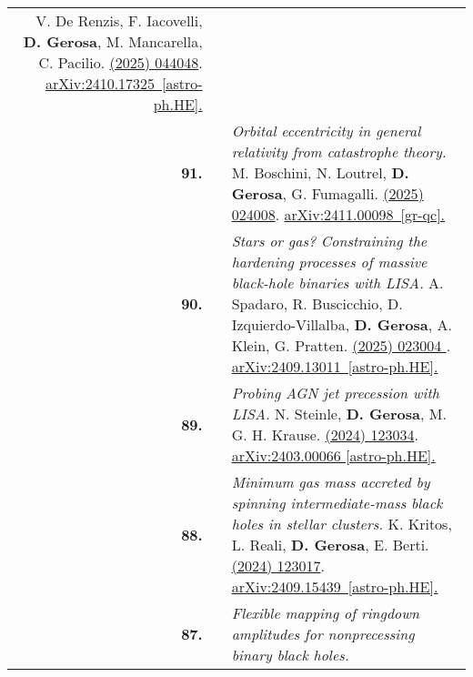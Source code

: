 {\begin{longtable}{rp{0.3cm}p{15.8cm}}
\newline{}
V. De Renzis, F. Iacovelli, \textbf{D. Gerosa}, M. Mancarella, C. Pacilio.
\newline{}
\href{https://journals.aps.org/prd/abstract/10.1103/PhysRevD.111.044048}{\prd 111 (2025) 044048}. \href{https://arxiv.org/abs/2410.17325}{arXiv:2410.17325 [astro-ph.HE].}
\vspace{0.09cm}\\
%
\textbf{91.} & & \textit{Orbital eccentricity in general relativity from catastrophe theory.}
\newline{}
M. Boschini, N. Loutrel, \textbf{D. Gerosa}, G. Fumagalli.
\newline{}
\href{https://journals.aps.org/prd/abstract/10.1103/PhysRevD.111.024008}{\prd 111 (2025) 024008}. \href{https://arxiv.org/abs/2411.00098}{arXiv:2411.00098 [gr-qc].}
\vspace{0.09cm}\\
%
\textbf{90.} & & \textit{Stars or gas? Constraining the hardening processes of massive black-hole binaries with LISA.}
\newline{}
A. Spadaro, R. Buscicchio, D. Izquierdo-Villalba, \textbf{D. Gerosa}, A. Klein, G. Pratten.
\newline{}
\href{https://journals.aps.org/prd/abstract/10.1103/PhysRevD.111.023004}{\prd 111 (2025) 023004 }. \href{https://arxiv.org/abs/2409.13011}{arXiv:2409.13011 [astro-ph.HE].}
\vspace{0.09cm}\\
%
\textbf{89.} & & \textit{Probing AGN jet precession with LISA.}
\newline{}
N. Steinle, \textbf{D. Gerosa}, M. G. H. Krause.
\newline{}
\href{https://journals.aps.org/prd/abstract/10.1103/PhysRevD.110.123034}{\prd 110 (2024) 123034}. \href{https://arxiv.org/abs/2403.00066}{arXiv:2403.00066 [astro-ph.HE].}
\vspace{0.09cm}\\
%
\textbf{88.} & & \textit{Minimum gas mass accreted by spinning intermediate-mass black holes in stellar clusters.}
\newline{}
K. Kritos, L. Reali, \textbf{D. Gerosa}, E. Berti.
\newline{}
\href{https://journals.aps.org/prd/abstract/10.1103/PhysRevD.110.123017}{\prd 110 (2024) 123017}. \href{https://arxiv.org/abs/2409.15439}{arXiv:2409.15439 [astro-ph.HE].}
\vspace{0.09cm}\\
%
\textbf{87.} & & \textit{Flexible mapping of ringdown amplitudes for nonprecessing binary black holes.}

\end{longtable}}
